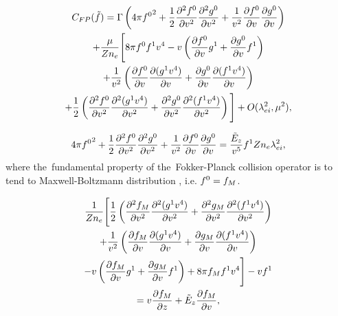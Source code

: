 \begin{multline}
  C_{FP}(\tilde{f}) = 
  \Gamma\left(4\pi{f^0}^2 + 
  \frac{1}{2}\frac{\partial^2 f^0}{\partial v^2}
  \frac{\partial^2 g^0}{\partial v^2}
  + \frac{1}{v^2}\frac{\partial{f^0}}{\partial{v}}\frac{\partial{g^0}}{\partial{v}} \right)
  \\
  + \frac{\mu}{Z n_e}
  \Bigg[8\pi f^0 f^1v^4 - v\left(\frac{\partial{f^0}}{\partial{v}}g^1
  + \frac{\partial{g^0}}{\partial{v}}f^1\right) 
  \\
  + \frac{1}{v^2}\left(\frac{\partial{f^0}}{\partial{v}}
  \frac{\partial{(g^1v^4)}}{\partial{v}}
  + \frac{\partial{g^0}}{\partial{v}}\frac{\partial{(f^1v^4)}}{\partial{v}}\right) \\
  + \frac{1}{2}\left(\frac{\partial^2 f^0}{\partial v^2}
  \frac{\partial^2 (g^1v^4)}{\partial v^2}
  + \frac{\partial^2 g^0}{\partial v^2} 
  \frac{\partial^2 (f^1v^4)}{\partial v^2}
  \right) \Bigg] + O(\lambda_{ei}^2, \mu^2) ,
  \nonumber
\end{multline}

\begin{equation}
  4\pi{f^0}^2 + 
  \frac{1}{2}\frac{\partial^2 f^0}{\partial v^2}
  \frac{\partial^2 g^0}{\partial v^2}
  + \frac{1}{v^2}\frac{\partial{f^0}}{\partial{v}}\frac{\partial{g^0}}{\partial{v}} = 
  \frac{\tilde{E}_z}{v^5}f^1 Z n_e\lambda_{ei}^2 ,
  \label{eq:FP_f0} 
\end{equation}
where the~fundamental property of the~Fokker-Planck collision operator
is to tend to Maxwell-Boltzmann distribution \cite{Longmire_1963}, i.e.
$f^0 = f_M$.

\begin{multline}
  \frac{1}{Z n_e}\Bigg[
  \frac{1}{2}\left(\frac{\partial^2 f_M}{\partial v^2}
  \frac{\partial^2 (g^1v^4)}{\partial v^2}
  + \frac{\partial^2 g_M}{\partial v^2} 
  \frac{\partial^2 (f^1v^4)}{\partial v^2}
  \right) \\ 
  + \frac{1}{v^2}\left(\frac{\partial{f_M}}{\partial{v}} \frac{\partial{(g^1v^4)}}{\partial{v}} 
  + \frac{\partial{g_M}}{\partial{v}}\frac{\partial{(f^1v^4)}}{\partial{v}}\right) \\
  - v\left(\frac{\partial{f_M}}{\partial{v}}g^1 
  + \frac{\partial{g_M}}{\partial{v}}f^1\right)
  + 8\pi f_M f^1v^4 \Bigg]
  - v f^1
  \\ =  
  v\frac{\partial{f_M}}{\partial{z}} + \tilde{E}_z\frac{\partial{f_M}}{\partial{v}}
  ,
  \label{eq:FP_f1_equation}
\end{multline}

